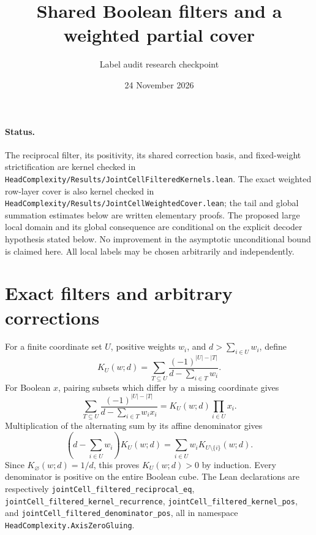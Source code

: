 \documentclass[11pt]{article}
\title{Shared Boolean filters and a weighted partial cover}
\author{Label audit research checkpoint}
\date{24 November 2026}
\begin{document}
\maketitle

\paragraph{Status.}
The reciprocal filter, its positivity, its shared correction basis, and
fixed-weight strictification are kernel checked in
\texttt{HeadComplexity/Results/JointCellFilteredKernels.lean}.
The exact weighted row-layer cover is also kernel checked in
\texttt{HeadComplexity/Results/JointCellWeightedCover.lean}; the tail and
global summation estimates below are written elementary proofs. The proposed
large local domain and its global consequence are conditional on the
explicit decoder hypothesis stated below. No improvement in the
asymptotic unconditional bound is claimed here. All local labels may be
chosen arbitrarily and independently.

\section{Exact filters and arbitrary corrections}

For a finite coordinate set $U$, positive weights $w_i$, and
$d>\sum_{i\in U}w_i$, define
\[
 K_U(w;d)=\sum_{T\subseteq U}
 \frac{(-1)^{|U|-|T|}}{d-\sum_{i\in T}w_i}.
\]
For Boolean $x$, pairing subsets which differ by a missing coordinate gives
\[
 \sum_{T\subseteq U}\frac{(-1)^{|U|-|T|}}
 {d-\sum_{i\in T}w_i x_i}
 =K_U(w;d)\prod_{i\in U}x_i.
\]
Multiplication of the alternating sum by its affine denominator gives
\[
 \left(d-\sum_{i\in U}w_i\right)K_U(w;d)
 =\sum_{i\in U}w_i K_{U\setminus\{i\}}(w;d).
\]
Since $K_\varnothing(w;d)=1/d$, this proves $K_U(w;d)>0$ by induction.
Every denominator is positive on the entire Boolean cube.
The Lean declarations are respectively
\texttt{jointCell\_filtered\_reciprocal\_eq},
\texttt{jointCell\_filtered\_kernel\_recurrence},
\texttt{jointCell\_filtered\_kernel\_pos}, and
\texttt{jointCell\_filtered\_denominator\_pos}, all in namespace
\texttt{HeadComplexity.AxisZeroGluing}.
\end{document}
